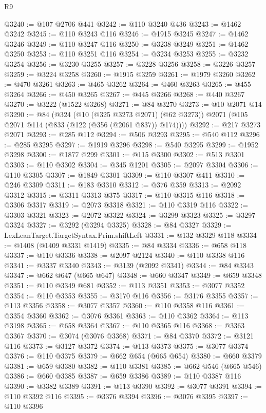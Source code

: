 \begin{lexlean}{R9}
\begin{coremodule}
@3240 := @107 @2706 @441
@3242 := @110 @3240 @436
@3243 := @1462 @3242
@3245 := @110 @3243 @116
@3246 := @1915 @3245
@3247 := @1462 @3246
@3249 := @110 @3247 @116
@3250 := @3238 @3249
@3251 := @1462 @3250
@3253 := @110 @3251 @116
@3254 := @3234 @3253
@3255 := @3232 @3254
@3256 := @3230 @3255
@3257 := @3228 @3256
@3258 := @3226 @3257
@3259 := @3224 @3258
@3260 := @1915 @3259
@3261 := @1979 @3260
@3262 := @470 @3261
@3263 := @465 @3262
@3264 := @460 @3263
@3265 := @455 @3264
@3266 := @450 @3265
@3267 := @445 @3266
@3268 := @440 @3267
@3270 := @3222 (@1522 @3268)
@3271 := @84 @3270
@3273 := @10 @2071 @14
@3290 := @84
    (@324
      (@10 (@325 @3273 @2071) (@62 @3273))
      @2071
      (@105 @2071 @114 (@833 (@122 (@356 (@2061 @837)) @174))))
@3292 := @217 @3273 @2071
@3293 := @285 @112
@3294 := @506 @3293
@3295 := @540 @112
@3296 := @285 @3295
@3297 := @1919 @3296
@3298 := @540 @3295
@3299 := @1952 @3298
@3300 := @1877 @299
@3301 := @115 @3300
@3302 := @513 @3301
@3303 := @110 @3302
@3304 := @345 @1201
@3305 := @2097 @3304
@3306 := @110 @3305
@3307 := @1849 @3301
@3309 := @110 @3307 @411
@3310 := @246 @3309
@3311 := @183 @3310
@3312 := @376 @359
@3313 := @2092 @3312
@3315 := @3311 @3313 @375
@3317 := @110 @3315 @116
@3318 := @3306 @3317
@3319 := @2073 @3318
@3321 := @110 @3319 @116
@3322 := @3303 @3321
@3323 := @2072 @3322
@3324 := @3299 @3323
@3325 := @3297 @3324
@3327 := @3292 (@3294 @3325)
@3328 := @84 @3327
@3329 := LexLeanTarget.TargetSyntax.Prim.shiftLeft
@3331 := @132 @3329 @118
@3334 := @1408 (@1409 @3331 @1419)
@3335 := @84 @3334
@3336 := @658 @118
@3337 := @110 @3336
@3338 := @2097 @2124
@3340 := @110 @3338 @116
@3341 := @3337 @3340
@3343 := @3139 (@2092 @3341)
@3344 := @84 @3343
@3347 := @662 @647 (@665 @647)
@3348 := @660 @3347
@3349 := @659 @3348
@3351 := @110 @3349 @681
@3352 := @113 @3351
@3353 := @3077 @3352
@3354 := @110 @3353
@3355 := @3170 @116
@3356 := @3176 @3355
@3357 := @113 @3356
@3358 := @3077 @3357
@3360 := @110 @3358 @116
@3361 := @3354 @3360
@3362 := @3076 @3361
@3363 := @110 @3362
@3364 := @113 @3198
@3365 := @658 @3364
@3367 := @110 @3365 @116
@3368 := @3363 @3367
@3370 := @3074 (@3076 @3368)
@3371 := @84 @3370
@3372 := @3121 @116
@3373 := @3127 @3372
@3374 := @113 @3373
@3375 := @3077 @3374
@3376 := @110 @3375
@3379 := @662 @654 (@665 @654)
@3380 := @660 @3379
@3381 := @659 @3380
@3382 := @110 @3381
@3385 := @662 @546 (@665 @546)
@3386 := @660 @3385
@3387 := @659 @3386
@3389 := @110 @3387 @116
@3390 := @3382 @3389
@3391 := @113 @3390
@3392 := @3077 @3391
@3394 := @110 @3392 @116
@3395 := @3376 @3394
@3396 := @3076 @3395
@3397 := @110 @3396

\end{coremodule}
\end{lexlean}
